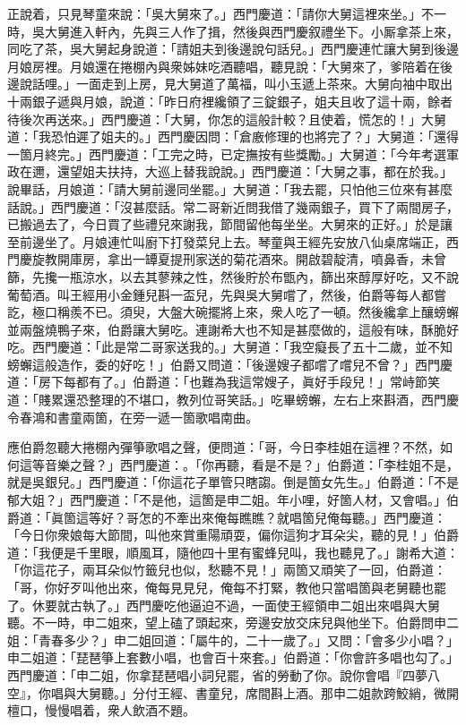 正說着，只見琴童來說：「吳大舅來了。」西門慶道：「請你大舅這裡來坐。」不一時，吳大舅進入軒內，先與三人作了揖，然後與西門慶叙禮坐下。小厮拿茶上來，同吃了茶，吳大舅起身說道：「請姐夫到後邊說句話兒。」西門慶連忙讓大舅到後邊月娘房裡。月娘還在捲棚內與衆姊妹吃酒聽唱，聽見說：「大舅來了，爹陪着在後邊說話哩。」一面走到上房，見大舅道了萬福，叫小玉遞上茶來。大舅向袖中取出十兩銀子遞與月娘，說道：「昨日府裡纔領了三錠銀子，姐夫且收了這十兩，餘者待後次再送來。」西門慶道：「大舅，你怎的這般計較？且使着，慌怎的！」大舅道：「我恐怕遲了姐夫的。」西門慶因問：「倉廒修理的也將完了？」大舅道：「還得一箇月終完。」西門慶道：「工完之時，已定撫按有些獎勵。」大舅道：「今年考選軍政在邇，還望姐夫扶持，大巡上替我說說。」西門慶道：「大舅之事，都在於我。」說畢話，月娘道：「請大舅前邊同坐罷。」大舅道：「我去罷，只怕他三位來有甚麼話說。」西門慶道：「沒甚麼話。常二哥新近問我借了幾兩銀子，買下了兩間房子，已搬過去了，今日買了些禮兒來謝我，節間留他每坐坐。大舅來的正好。」於是讓至前邊坐了。月娘連忙叫廚下打發菜兒上去。琴童與王經先安放八仙桌席端正，西門慶旋教開庫房，拿出一罈夏提刑家送的菊花酒來。開啟碧靛清，噴鼻香，未曾篩，先攙一瓶涼水，以去其蓼辣之性，然後貯於布甑內，篩出來醇厚好吃，又不說葡萄酒。叫王經用小金鍾兒斟一盃兒，先與吳大舅嚐了，然後，伯爵等每人都嘗訖，極口稱羨不已。須臾，大盤大碗擺將上來，衆人吃了一頓。然後纔拿上釀螃蠏並兩盤燒鴨子來，伯爵讓大舅吃。連謝希大也不知是甚麼做的，這般有味，酥脆好吃。西門慶道：「此是常二哥家送我的。」大舅道：「我空癡長了五十二歲，並不知螃蠏這般造作，委的好吃！」伯爵又問道：「後邊嫂子都嚐了嚐兒不曾？」西門慶道：「房下每都有了。」伯爵道：「也難為我這常嫂子，眞好手段兒！」常峙節笑道：「賤累還恐整理的不堪口，教列位哥笑話。」吃畢螃蠏，左右上來斟酒，西門慶令春鴻和書童兩箇，在旁一遞一箇歌唱南曲。

應伯爵忽聽大捲棚內彈箏歌唱之聲，便問道：「哥，今日李桂姐在這裡？不然，如何這等音樂之聲？」西門慶道：。「你再聽，看是不是？」伯爵道：「李桂姐不是，就是吳銀兒。」西門慶道：「你這花子單管只瞎謅。倒是箇女先生。」伯爵道：「不是郁大姐？」西門慶道：「不是他，這箇是申二姐。年小哩，好箇人材，又會唱。」伯爵道：「眞箇這等好？哥怎的不牽出來俺每瞧瞧？就唱箇兒俺每聽。」西門慶道：「今日你衆娘每大節間，叫他來賞重陽頑耍，偏你這狗才耳朵尖，聽的見！」伯爵道：「我便是千里眼，順風耳，隨他四十里有蜜蜂兒叫，我也聽見了。」謝希大道：「你這花子，兩耳朵似竹籤兒也似，愁聽不見！」兩箇又頑笑了一回，伯爵道：「哥，你好歹叫他出來，俺每見見兒，俺每不打緊，教他只當唱箇與老舅聽也罷了。休要就古執了。」西門慶吃他逼迫不過，一面使王經領申二姐出來唱與大舅聽。不一時，申二姐來，望上磕了頭起來，旁邊安放交床兒與他坐下。伯爵問申二姐：「青春多少？」申二姐回道：「屬牛的，二十一歲了。」又問：「會多少小唱？」申二姐道：「琵琶箏上套數小唱，也會百十來套。」伯爵道：「你會許多唱也勾了。」西門慶道：「申二姐，你拿琵琶唱小詞兒罷，省的勞動了你。說你會唱『四夢八空』，你唱與大舅聽。」分付王經、書童兒，席間斟上酒。那申二姐款跨鮫綃，微開檀口，慢慢唱着，衆人飲酒不題。

